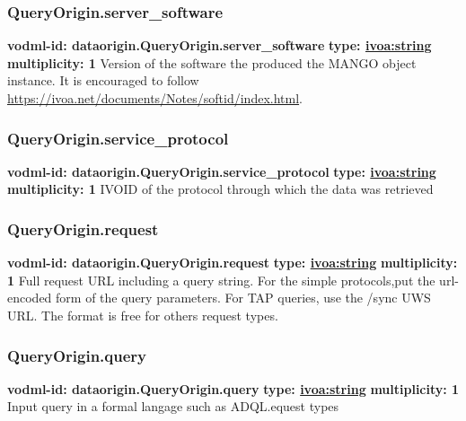     \subsubsection{QueryOrigin.server\_software}
      \textbf{vodml-id: dataorigin.QueryOrigin.server\_software} \newline
      \textbf{type: \hyperref[sect:ivoa]{ivoa:string}} \newline
      \textbf{multiplicity: 1} \newline
      Version of the software the produced the MANGO object instance. It is encouraged to follow \url{https://ivoa.net/documents/Notes/softid/index.html}.

    \subsubsection{QueryOrigin.service\_protocol}
      \textbf{vodml-id: dataorigin.QueryOrigin.service\_protocol} \newline
      \textbf{type: \hyperref[sect:ivoa]{ivoa:string}} \newline
      \textbf{multiplicity: 1} \newline
      IVOID \citep{2007ivoa.spec.0314P} of the protocol through which the data was retrieved

    \subsubsection{QueryOrigin.request}
      \textbf{vodml-id: dataorigin.QueryOrigin.request} \newline
      \textbf{type: \hyperref[sect:ivoa]{ivoa:string}} \newline
      \textbf{multiplicity: 1} \newline
      Full request URL including a query string. For the simple protocols,put the url-encoded form of the query parameters. For TAP queries, use the /sync UWS \citep{2016ivoa.spec.1024H} URL. The format is free for others request types.

    \subsubsection{QueryOrigin.query}
      \textbf{vodml-id: dataorigin.QueryOrigin.query} \newline
      \textbf{type: \hyperref[sect:ivoa]{ivoa:string}} \newline
      \textbf{multiplicity: 1} \newline
      Input query in a formal langage such as ADQL.equest types \citep{2023ivoa.spec.1215M}

